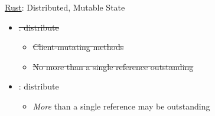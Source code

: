 \begin{frame}[fragile]{\underline{Rust}: Distributed, Mutable State \hfill {\footnotesize \currentname}}


    \begin{itemize}

    \item \sout<1->{: distribute }
        \begin{itemize}
            \item \sout<1->{Client-mutating methods}
            \item \sout<1->{No more than a single reference outstanding}
        \end{itemize}

    \item {}: distribute 
        \begin{itemize}
            \item \textit{More} than a single reference may be outstanding
        \end{itemize}

    \end{itemize}

    \vfill

\end{frame}

